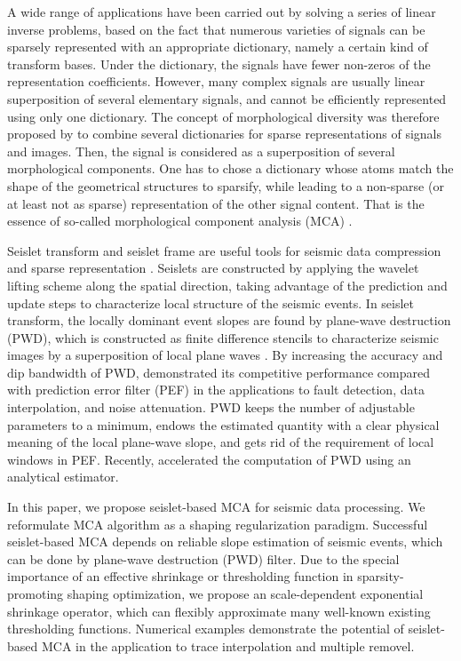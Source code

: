 A wide range of applications have been carried out by solving a series of linear inverse problems, based on the fact that numerous varieties of signals can be sparsely represented with an appropriate dictionary, namely a certain kind of transform bases. Under the dictionary, the signals have fewer non-zeros of the representation coefficients. However, many complex signals are usually linear superposition of several elementary signals, and cannot be efficiently represented using only one dictionary. The concept of morphological diversity was therefore proposed by \cite{starck2004redundant,starck2005image} to combine several dictionaries for sparse representations of signals and images. Then, the signal is considered as a superposition of several morphological components. One has to chose a dictionary whose atoms match the shape of the geometrical structures to sparsify, while leading to a non-sparse (or at least not as sparse) representation of the other signal content. That is the essence of so-called morphological component analysis (MCA) \citep{starck2004redundant,starck2007undecimated,woiselle20113}.

Seislet transform and seislet frame are useful tools for seismic data compression and sparse representation \citep{fomel2010seislet}. Seislets are constructed by applying the wavelet lifting scheme \citep{sweldens1998lifting} along the spatial direction, taking advantage of the prediction and update steps to characterize local structure of the seismic events.
In seislet transform, the locally dominant event slopes are found by plane-wave destruction (PWD), which is constructed as finite difference stencils to characterize seismic images by a superposition of local plane waves \citep{claerbout1992earth}. By increasing the accuracy and dip bandwidth of PWD, \cite{fomel2002applications} demonstrated its competitive performance compared with prediction error filter (PEF) in the applications to fault detection, data interpolation, and noise attenuation. PWD keeps the number of adjustable parameters to a minimum, endows the estimated quantity with a clear physical meaning of the local plane-wave slope, and gets rid of the requirement of local windows in PEF. Recently, \cite{chen2013accelerated} accelerated the computation of PWD using an analytical estimator.


In this paper, we propose seislet-based MCA for seismic data processing. We reformulate MCA algorithm as a shaping regularization paradigm. Successful seislet-based MCA depends on reliable slope estimation of seismic events, which can be done by plane-wave destruction (PWD) filter. Due to the special importance of an effective shrinkage or thresholding function in sparsity-promoting shaping optimization, we propose an scale-dependent exponential shrinkage operator, which can flexibly  approximate many well-known existing thresholding functions. Numerical examples demonstrate the potential of seislet-based MCA in the application to trace interpolation and multiple removel.

